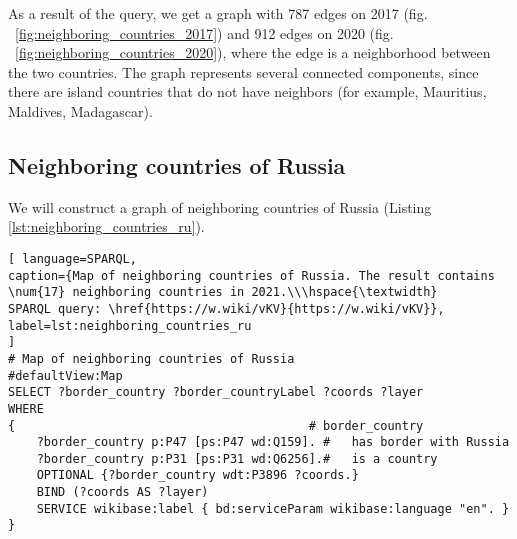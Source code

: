 

As a result of the query, we get a graph with 787 edges on 2017 (fig. ~\ref{fig:neighboring_countries_2017}) and 912 edges on 2020 (fig. ~\ref{fig:neighboring_countries_2020}), where the edge is a neighborhood between the two countries. The graph represents several connected components, since there are island countries that do not have neighbors (for example, Mauritius, Maldives, Madagascar).

\subsection{Neighboring countries of Russia}

We will construct a graph of neighboring countries of Russia (Listing \ref{lst:neighboring_countries_ru}).
\begin{lstlisting}[ language=SPARQL, 
caption={Map of neighboring countries of Russia. The result contains \num{17} neighboring countries in 2021.\\\hspace{\textwidth}
SPARQL query: \href{https://w.wiki/vKV}{https://w.wiki/vKV}},
label=lst:neighboring_countries_ru
]
# Map of neighboring countries of Russia
#defaultView:Map
SELECT ?border_country ?border_countryLabel ?coords ?layer
WHERE 
{                                         # border_country
	?border_country p:P47 [ps:P47 wd:Q159]. #   has border with Russia
	?border_country p:P31 [ps:P31 wd:Q6256].#   is a country
	OPTIONAL {?border_country wdt:P3896 ?coords.}
	BIND (?coords AS ?layer)
	SERVICE wikibase:label { bd:serviceParam wikibase:language "en". }
}
\end{lstlisting}

